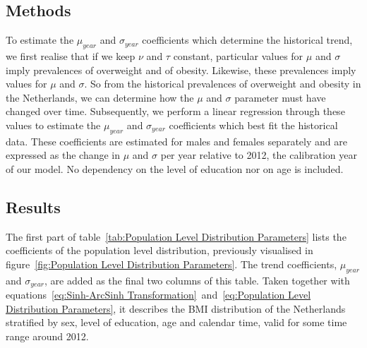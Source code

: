 \documentclass{imammb}
\numberwithin{equation}{section}
\begin{document}
\subsection{Methods}
\label{sec:Historical Trend/Methods}

To estimate the $\mu_{year}$ and $\sigma_{year}$ coefficients which determine the historical trend, we first realise that if we keep $\nu$ and $\tau$ constant, particular values for $\mu$ and $\sigma$ imply prevalences of overweight and of obesity. Likewise, these prevalences imply values for $\mu$ and $\sigma$. So from the historical prevalences of overweight and obesity in the Netherlands, we can determine how the $\mu$ and $\sigma$ parameter must have changed over time. Subsequently, we perform a linear regression through these values to estimate the $\mu_{year}$ and $\sigma_{year}$ coefficients which best fit the historical data. These coefficients are estimated for males and females separately and are expressed as the change in $\mu$ and $\sigma$ per year relative to 2012, the calibration year of our model. No dependency on the level of education nor on age is included.

\vspace{-1mm}

\subsection{Results}
\label{sec:Historical Trend/Results}

The first part of table~\ref{tab:Population Level Distribution Parameters} lists the coefficients of the population level distribution, previously visualised in figure~\ref{fig:Population Level Distribution Parameters}. The trend coefficients, $\mu_{year}$ and $\sigma_{year}$, are added as the final two columns of this table. Taken together with equations~\ref{eq:Sinh-ArcSinh Transformation}~and~\ref{eq:Population Level Distribution Parameters}, it describes the BMI distribution of the Netherlands stratified by sex, level of education, age and calendar time, valid for some time range around 2012.
\end{document}
